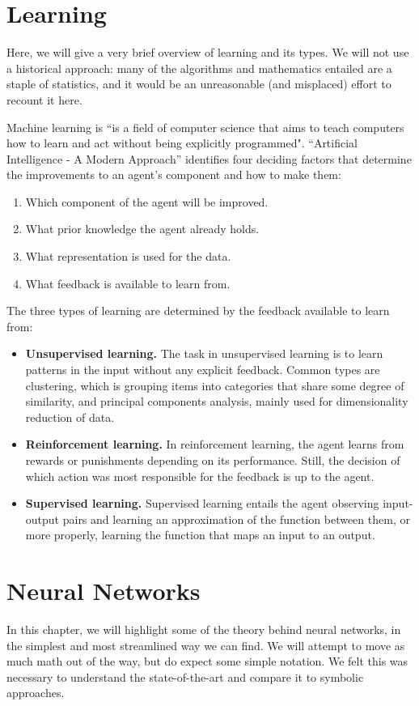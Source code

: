 \documentclass[../main.tex]{subfiles}
\begin{document}
\section{Learning}
Here, we will give a very brief overview of learning and its types. We will not use a historical approach: many of the algorithms and mathematics entailed are a staple of statistics, and it would be an unreasonable (and misplaced) effort to recount it here.

Machine learning is ``is a field of computer science that aims to teach computers how to learn and act without being explicitly programmed\cite{MachineLearning2019}". ``Artificial Intelligence - A Modern Approach'' identifies four deciding factors that determine the improvements to an agent's component and how to make them:
\begin{enumerate}
    \item Which component of the agent will be improved.
    \item What prior knowledge the agent already holds.
    \item What representation is used for the data.
    \item What feedback is available to learn from.
\end{enumerate}
The three types of learning are determined by the feedback available to learn from:
\begin{itemize}
    \item \textbf{Unsupervised learning.} The task in unsupervised learning is to learn patterns in the input without any explicit feedback. Common types are clustering, which is grouping items into categories that share some degree of similarity, and principal components analysis, mainly used for dimensionality reduction of data.
    \item \textbf{Reinforcement learning.} In reinforcement learning, the agent learns from rewards or punishments depending on its performance. Still, the decision of which action was most responsible for the feedback is up to the agent.
    \item \textbf{Supervised learning.} Supervised learning entails the agent observing input-output pairs and learning an approximation of the function between them, or more properly, learning the function that maps an input to an output.
\end{itemize}

\section{Neural Networks}
In this chapter, we will highlight some of the theory behind neural networks, in the simplest and most streamlined way we can find. We will attempt to move as much math out of the way, but do expect some simple notation. We felt this was necessary to understand the state-of-the-art and compare it to symbolic approaches.
\end{document}
